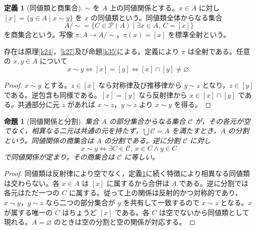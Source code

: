 \documentclass[a5paper,10pt,dvipdfmx]{jsarticle}
\theoremstyle{definition}
\newtheorem{defn}[ruledef]{定義}
\theoremstyle{plain}
\newtheorem{prop}[ruledef]{命題}
\newcommand{\iffc}{\Longleftrightarrow}
\newcommand{\Pow}{\mathcal{P}}
\begin{document}
\begin{defn}[同値類と商集合]\label{k53}
$\sim$ を $A$ 上の同値関係とする。$x\in A$ に対し $[x]=\{y\in A\mid x\sim y\}$ を $x$ の同値類という。同値類全体からなる集合
\[
 A/{\sim}=\{C\in\Pow(A)\mid\exists x\in A,\ C=[x]\}
\]
を商集合という。写像 $\pi:A\to A/{\sim}$，$\pi(x)=[x]$ を標準全射という。
\end{defn}
存在は原理\ref{k24}，\ref{k27}及び命題\ref{k35}による。定義により $\pi$ は全射である。任意の $x,y\in A$ について
\[
 x\sim y\iffc [x]=[y]\iffc [x]\cap[y]\ne\varnothing.
\]
\begin{proof}
$x\sim y$ とする。$z\in[x]$ なら対称律及び推移律から $y\sim z$ となり，$z\in[y]$ である。逆包含も同様である。$[x]=[y]$ なら反射律から $x\in[x]\cap[y]$ である。共通部分に元 $z$ があれば $x\sim z$，$y\sim z$ より $x\sim y$ を得る。
\end{proof}
\begin{prop}[同値関係と分割]\label{k54}
集合 $A$ の部分集合からなる集合 $\mathcal C$ が，その各元が空でなく，相異なる二元は共通の元を持たず，$\bigcup\mathcal C=A$ を満たすとき，$A$ の分割という。同値関係の商集合は $A$ の分割である。逆に分割 $\mathcal C$ に対し
\[
 x\sim y\iffc\exists C\in\mathcal C,\ x\in C\land y\in C
\]
で同値関係が定まり，その商集合は $\mathcal C$ に等しい。
\end{prop}
\begin{proof}
同値類は反射律により空でなく，定義\ref{k53}に続く特徴により相異なる同値類は交わらない。各 $x\in A$ は $[x]$ に属するから合併は $A$ である。逆に分割では各元はただ一つの $C$ に属する。従って上の関係は反射的かつ対称的であり，$x\sim y$，$y\sim z$ なら二つの部分集合が $y$ を共有して一致するので $x\sim z$ となる。$x$ が属する唯一の $C$ はちょうど $[x]$ である。各 $C$ は空でないから同値類として現れる。$A=\varnothing$ のときは空の分割と空の関係が対応する。
\end{proof}
\end{document}
